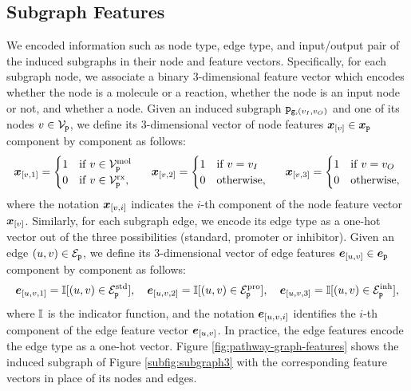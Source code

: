 \subsection{Subgraph Features}
We encoded information such as node type, edge type, and input/output pair of the induced subgraphs in their node and feature vectors. Specifically, for each subgraph node, we associate a binary 3-dimensional feature vector which encodes whether the node is a molecule or a reaction, whether the node is an input node or not, and whether a node. Given an induced subgraph $\mathtt{p}_{\mathtt{g}, (v_I,v_O)}$ and one of its nodes $v \in \Nodes_{\Graph{p}}$, we define its 3-dimensional vector of node features $\Elem{x}{v} \in \Vector{x}_{\Graph{p}}$ component by component as follows:
\begin{align*}
    \Elem{x}{v, 1} = \begin{cases}
        1  & \mathrm{if}\; v \in \Nodes_{\Graph{p}}^{\Fun{mol}}\\
        0  & \mathrm{if}\; v \in \Nodes_{\Graph{p}}^{\Fun{rx}},
    \end{cases}
    \hspace{1.5em}
    \Elem{x}{v, 2} = \begin{cases}
        1  & \mathrm{if}\; v = v_I\\
        0  & \mathrm{otherwise},
    \end{cases}
    \hspace{1.5em}
    \Elem{x}{v, 3} = \begin{cases}
        1  & \mathrm{if}\; v = v_O\\
        0  & \mathrm{otherwise},
    \end{cases}
\end{align*}
where the notation $\Elem{x}{v, i}$ indicates the $i$-th component of the node feature vector $\Elem{x}{v}$.
Similarly, for each subgraph edge, we encode its edge type as a one-hot vector out of the three possibilities (standard, promoter or inhibitor). Given an edge $(u,v) \in \Edges_{\Graph{p}}$, we define its 3-dimensional vector of edge features $\Elem{e}{u, v} \in \Vector{e}_{\Graph{p}}$ component by component as follows:
\begin{align*}
    \Elem{e}{u, v, 1} = \Indic[(u,v) \in \Edges_{\Graph{p}}^{\Fun{std}}], \quad
    \Elem{e}{u, v, 2} = \Indic[(u,v) \in \Edges_{\Graph{p}}^{\Fun{pro}}], \quad
    \Elem{e}{u, v, 3} = \Indic[(u,v) \in \Edges_{\Graph{p}}^{\Fun{inh}}],
\end{align*}
where $\mathbb{I}$ is the indicator function, and the notation $\Elem{e}{u, v, i}$ identifies the $i$-th component of the edge feature vector $\Elem{e}{u, v}$. In practice, the edge features encode the edge type as a one-hot vector. Figure \ref{fig:pathway-graph-features} shows the induced subgraph of Figure \ref{subfig:subgraph3} with the corresponding feature vectors in place of its nodes and edges.
